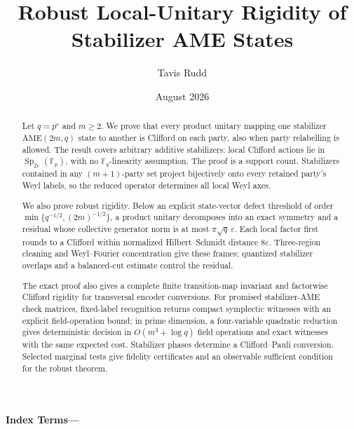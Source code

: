 \documentclass[11pt]{article}
\title{Robust Local-Unitary Rigidity of Stabilizer AME States}
\author{Tavis Rudd}
\date{August 2026}
\numberwithin{equation}{section}
\theoremstyle{upright}
\theoremstyle{definition}
\theoremstyle{remark}
\newcommand{\F}{\mathbb F}
\newcommand{\AME}{\mathrm{AME}}
\begin{document}
\maketitle

\begin{abstract}
Let \(q=p^e\) and \(m\geq2\).  We prove that every product unitary
mapping one stabilizer \(\AME(2m,q)\) state to another is Clifford on each
party, also when party relabelling is allowed.  The result covers arbitrary
additive stabilizers: local Clifford actions lie in
\(\operatorname{Sp}_{2e}(\F_p)\), with no \(\F_q\)-linearity assumption.
The proof is a support count.  Stabilizers contained in any
\((m+1)\)-party set project bijectively onto every retained party's Weyl
labels, so the reduced operator determines all local Weyl axes.

We also prove robust rigidity.  Below an explicit state-vector defect
threshold of order \(\min\{q^{-1/2},(2m)^{-1/2}\}\), a product unitary
decomposes into an exact symmetry and a residual whose collective generator
norm is at most \(\pi\sqrt q\,\varepsilon\).  Each local factor first
rounds to a Clifford within normalized Hilbert--Schmidt distance
\(8\varepsilon\).  Three-region cleaning and Weyl--Fourier concentration
give these frames; quantized stabilizer overlaps and a balanced-cut estimate
control the residual.

The exact proof also gives a complete finite transition-map invariant and
factorwise Clifford rigidity for transversal encoder conversions.
For promised stabilizer-AME check matrices, fixed-label recognition returns
compact symplectic witnesses with an explicit field-operation bound;
in prime dimension, a four-variable quadratic reduction gives deterministic
decision in \(O(m^3+\log q)\) field operations and exact witnesses with
the same expected cost.  Stabilizer phases determine a Clifford--Pauli conversion.
Selected marginal tests give fidelity certificates and an observable
sufficient condition for the robust theorem.
\end{abstract}
\noindent\textbf{Index Terms---}








\appendix




\end{document}
